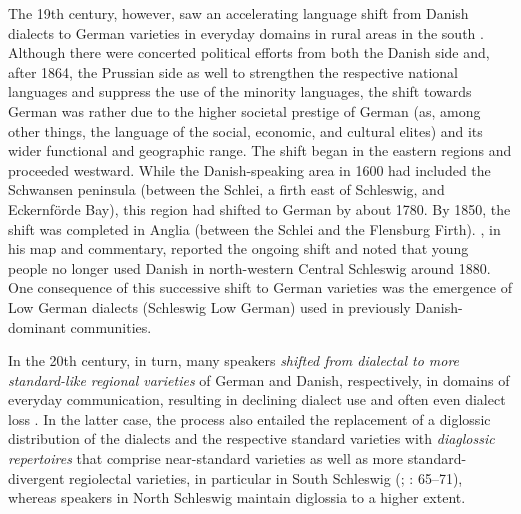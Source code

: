 \documentclass[output=paper]{langsci/langscibook}
\begin{document}
The 19th century, however, saw an accelerating language shift from Danish dialects to German varieties in everyday domains in rural areas in the south \citep[59]{Hoder.2019}. Although there were concerted political efforts from both the Danish side and, after 1864, the Prussian side as well to strengthen the respective national languages and suppress the use of the minority languages, the shift towards German was rather due to the higher societal prestige of German (as, among other things, the language of the social, economic, and cultural elites) and its wider functional and geographic range. The shift began in the eastern regions and proceeded westward. While the Danish-speaking area in 1600 had included the Schwansen peninsula (between the Schlei, a firth east of Schleswig, and Eckernförde Bay), this region had shifted to German by about 1780. By 1850, the shift was completed in Anglia (between the Schlei and the Flensburg Firth). \citet[3--6]{Wenker.2013}, in his map and commentary, reported the ongoing shift and noted that young people no longer used Danish in north-western Central Schleswig around 1880. One consequence of this successive shift to German varieties was the emergence of Low German dialects (Schleswig Low German) used in previously Danish-dominant communities.

In the 20th century, in turn, many speakers \textit{shifted from dialectal to more standard-like regional varieties} of German and Danish, respectively, in domains of everyday communication, resulting in declining dialect use and often even dialect loss \citep[62]{Hoder.2019}. In the latter case, the process also entailed the replacement of a diglossic distribution of the dialects and the respective standard varieties with \textit{diaglossic repertoires} \citep{Auer.2011} that comprise near-standard varieties as well as more standard-divergent regiolectal varieties, in particular in South Schleswig (\citealt{Hoder.2011}; \citeyear{Hoder.2019}: 65--71), whereas speakers in North Schleswig maintain diglossia to a higher extent.
\end{document}

